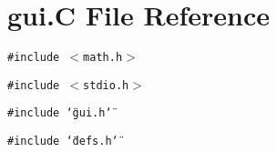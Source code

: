 \section{gui.C File Reference}
\label{gui_8C}
{\tt \#include $<$math.h$>$}\par
{\tt \#include $<$stdio.h$>$}\par
{\tt \#include \char`\"{}gui.h\char`\"{}}\par
{\tt \#include \char`\"{}defs.h\char`\"{}}\par
